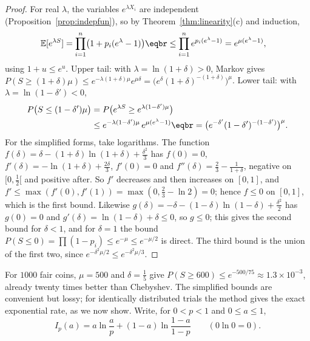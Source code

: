 \begin{proof}
For real $\lambda$, the variables $e^{\lambda X_i}$ are independent (Proposition~\ref{prop:indepfun}), so by Theorem~\ref{thm:linearity}(c) and induction,
\[
\begin{aligned}\mathbb E[e^{\lambda S}]&=\prod_{i=1}^n\bigl(1+p_i(e^\lambda-1)\bigr)\eqbr\le\prod_{i=1}^ne^{p_i(e^\lambda-1)}=e^{\mu(e^\lambda-1)},\end{aligned}
\]
using $1+u\le e^u$. Upper tail: with $\lambda=\ln(1+\delta)>0$, Markov gives
$P(S\ge(1+\delta)\mu)\le e^{-\lambda(1+\delta)\mu}e^{\mu\delta}=\bigl(e^\delta(1+\delta)^{-(1+\delta)}\bigr)^\mu$. Lower tail: with $\lambda=\ln(1-\delta')<0$,
\[
\begin{aligned}
P\bigl(S\le(1-\delta')\mu\bigr)&=P\bigl(e^{\lambda S}\ge e^{\lambda(1-\delta')\mu}\bigr)\\
&\le e^{-\lambda(1-\delta')\mu}\,e^{\mu(e^\lambda-1)}\eqbr=\bigl(e^{-\delta'}(1-\delta')^{-(1-\delta')}\bigr)^\mu.
\end{aligned}
\]
For the simplified forms, take logarithms. The function $f(\delta)=\delta-(1+\delta)\ln(1+\delta)+\frac{\delta^2}3$ has $f(0)=0$,
$f'(\delta)=-\ln(1+\delta)+\frac{2\delta}3$, $f'(0)=0$ and $f''(\delta)=\frac23-\frac1{1+\delta}$, negative on $[0,\frac12[$ and positive after. So $f'$
decreases and then increases on $[0,1]$, and $f'\le\max(f'(0),f'(1))=\max(0,\frac23-\ln2)=0$; hence $f\le0$ on $[0,1]$, which is
the first bound. Likewise $g(\delta)=-\delta-(1-\delta)\ln(1-\delta)+\frac{\delta^2}2$ has $g(0)=0$ and $g'(\delta)=\ln(1-\delta)+\delta\le0$, so $g\le0$; this
gives the second bound for $\delta<1$, and for $\delta=1$ the bound $P(S\le0)=\prod(1-p_i)\le e^{-\mu}\le e^{-\mu/2}$ is direct. The third bound is
the union of the first two, since $e^{-\delta^2\mu/2}\le e^{-\delta^2\mu/3}$.
\end{proof}

For $1000$ fair coins, $\mu=500$ and $\delta=\frac15$ give $P(S\ge600)\le e^{-500/75}\approx1.3\times10^{-3}$, already twenty times better than
Chebyshev. The simplified bounds are convenient but lossy; for identically distributed trials the method gives the
exact exponential rate, as we now show. Write, for $0<p<1$ and $0\le a\le1$,
\[
I_p(a)=a\ln\frac ap+(1-a)\ln\frac{1-a}{1-p}\qquad(0\ln0=0).
\]

